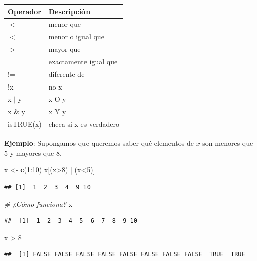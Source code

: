 \documentclass[]{article}
\newenvironment{Shaded}{\begin{snugshade}}{\end{snugshade}}
\newcommand{\KeywordTok}[1]{\textcolor[rgb]{0.13,0.29,0.53}{\textbf{{#1}}}}
\newcommand{\DecValTok}[1]{\textcolor[rgb]{0.00,0.00,0.81}{{#1}}}
\newcommand{\StringTok}[1]{\textcolor[rgb]{0.31,0.60,0.02}{{#1}}}
\newcommand{\CommentTok}[1]{\textcolor[rgb]{0.56,0.35,0.01}{\textit{{#1}}}}
\newcommand{\NormalTok}[1]{{#1}}
\begin{document}
\begin{table}[ht]
\centering
\begin{tabular}{ll}
  \hline
Operador & Descripción \\ 
  \hline
$<$ & menor que \\ 
  $<$= & menor o igual que \\ 
  $>$ & mayor que \\ 
  == & exactamente igual que \\ 
  != & diferente de \\ 
  !x &  no x \\ 
  x $|$ y & x O y \\ 
  x \& y & x Y y \\ 
  isTRUE(x) & checa si x es verdadero \\ 
   \hline
\end{tabular}
\end{table}

\textbf{Ejemplo}: Supongamos que queremos saber qué elementos de $x$ son
menores que $5$ y mayores que $8$.

\begin{Shaded}
\begin{Highlighting}[]
\NormalTok{x <-}\StringTok{ }\KeywordTok{c}\NormalTok{(}\DecValTok{1}\NormalTok{:}\DecValTok{10}\NormalTok{)}
\NormalTok{x[(x>}\DecValTok{8}\NormalTok{) |}\StringTok{ }\NormalTok{(x<}\DecValTok{5}\NormalTok{)]}
\end{Highlighting}
\end{Shaded}

\begin{verbatim}
## [1]  1  2  3  4  9 10
\end{verbatim}

\begin{Shaded}
\begin{Highlighting}[]
\CommentTok{# ¿Cómo funciona?}
\NormalTok{x}
\end{Highlighting}
\end{Shaded}

\begin{verbatim}
##  [1]  1  2  3  4  5  6  7  8  9 10
\end{verbatim}

\begin{Shaded}
\begin{Highlighting}[]
\NormalTok{x >}\StringTok{ }\DecValTok{8}
\end{Highlighting}
\end{Shaded}

\begin{verbatim}
##  [1] FALSE FALSE FALSE FALSE FALSE FALSE FALSE FALSE  TRUE  TRUE
\end{verbatim}
\end{document}

